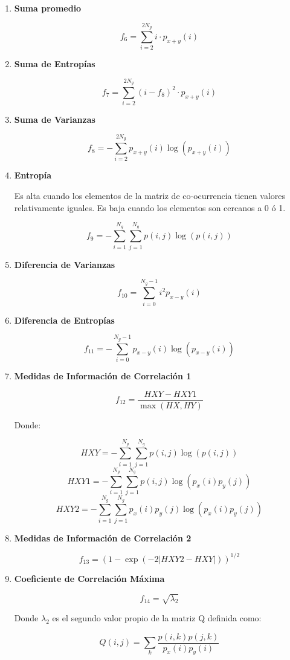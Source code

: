 \begin{enumerate}
\item \textbf{Suma promedio}

\[f_6 = \sum_{i=2}^{2N_g}i \cdot p_{x+y}(i)\]

\item \textbf{Suma de Entropías}

\[f_7 = \sum_{i=2}^{2N_g}(i-f_8)^2 \cdot p_{x+y}(i)\]

\item \textbf{Suma de Varianzas}

\[f_8 = -\sum_{i=2}^{2N_g}p_{x+y}(i)\log(p_{x+y}(i))\]

\item \textbf{Entropía}

Es alta cuando los elementos de la matriz de co-ocurrencia tienen valores relativamente iguales. Es baja cuando los elementos son cercanos a 0 ó 1.

\[f_9 = -\sum_{i=1}^{N_g}\sum_{j=1}^{N_g}p(i,j)\log(p(i,j))\]

\item \textbf{Diferencia de Varianzas}

\[f_{10} = \sum_{i=0}^{N_g-1} i^2 p_{x-y}(i)\]

\item \textbf{Diferencia de Entropías}

\[f_{11} = -\sum_{i=0}^{N_g-1}p_{x-y}(i)\log(p_{x-y}(i))\]

\item \textbf{Medidas de Información de Correlación 1}

\[f_{12} = \frac{HXY-HXY1}{\max(HX,HY)}\]

Donde:

\[HXY = -\sum_{i=1}^{N_g}\sum_{j=1}^{N_g}p(i,j)\log(p(i,j))\]
\[HXY1 = -\sum_{i=1}^{N_g}\sum_{j=1}^{N_g}p(i,j)\log(p_x(i) p_y(j))\]
\[HXY2 = -\sum_{i=1}^{N_g}\sum_{j=1}^{N_g}p_x(i) p_y(j)\log(p_x(i) p_y(j))\]

\item \textbf{Medidas de Información de Correlación 2}

\[f_{13} = (1- \exp(-2 |HXY2 - HXY|))^{1/2}\]

\item \textbf{Coeficiente de Correlación Máxima}

\[f_{14} = \sqrt{\lambda_2 }\]

Donde $\lambda_2$ es el segundo valor propio de la matriz Q definida como:

\[Q(i,j) = \sum_k\frac{p(i,k)p(j,k)}{p_x(i)p_y(i)}\]
\end{enumerate}


